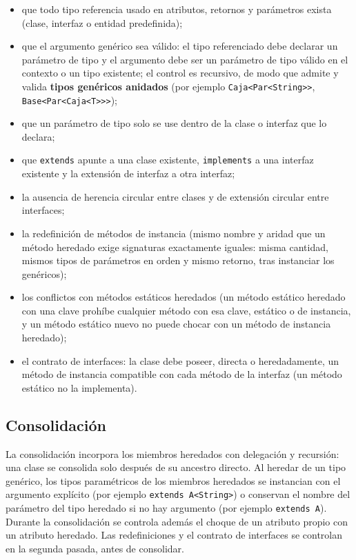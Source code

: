 \documentclass[11pt,a4paper]{article}
\begin{document}
\begin{itemize}
  \item que todo tipo referencia usado en atributos, retornos y parámetros exista
        (clase, interfaz o entidad predefinida);
  \item que el argumento genérico sea válido: el tipo referenciado debe declarar un
        parámetro de tipo y el argumento debe ser un parámetro de tipo válido en el
        contexto o un tipo existente; el control es recursivo, de modo que admite y
        valida \textbf{tipos genéricos anidados} (por ejemplo \texttt{Caja<Par<String>>},
        \texttt{Base<Par<Caja<T>>>});
  \item que un parámetro de tipo solo se use dentro de la clase o interfaz que lo
        declara;
  \item que \texttt{extends} apunte a una clase existente, \texttt{implements} a una
        interfaz existente y la extensión de interfaz a otra interfaz;
  \item la ausencia de herencia circular entre clases y de extensión circular entre
        interfaces;
  \item la redefinición de métodos de instancia (mismo nombre y aridad que un método
        heredado exige signaturas exactamente iguales: misma cantidad, mismos tipos
        de parámetros en orden y mismo retorno, tras instanciar los genéricos);
  \item los conflictos con métodos estáticos heredados (un método estático heredado
        con una clave prohíbe cualquier método con esa clave, estático o de
        instancia, y un método estático nuevo no puede chocar con un método de
        instancia heredado);
  \item el contrato de interfaces: la clase debe poseer, directa o heredadamente, un
        método de instancia compatible con cada método de la interfaz (un método
        estático no la implementa).
\end{itemize}

\subsection{Consolidación}

La consolidación incorpora los miembros heredados con delegación y recursión: una
clase se consolida solo después de su ancestro directo. Al heredar de un tipo
genérico, los tipos paramétricos de los miembros heredados se instancian con el
argumento explícito (por ejemplo \texttt{extends A<String>}) o conservan el nombre
del parámetro del tipo heredado si no hay argumento (por ejemplo \texttt{extends A}).
Durante la consolidación se controla además el choque de un atributo propio con un
atributo heredado. Las redefiniciones y el contrato de interfaces se controlan en la
segunda pasada, antes de consolidar.
\end{document}
